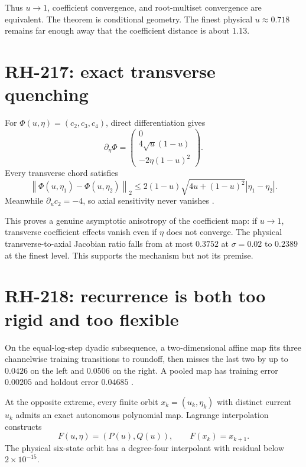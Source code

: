 \documentclass[12pt]{article}
\theoremstyle{remark}\newtheorem{remark}[theorem]{Remark}
\newcommand{\norm}[1]{\left\lVert#1\right\rVert}
\begin{document}
Thus $u\to1$, coefficient convergence, and root-multiset convergence are
equivalent.  The theorem is conditional geometry.  The finest physical
$u\approx0.718$ remains far enough away that the coefficient distance is
about $1.13$.

\section{RH-217: exact transverse quenching}

For $\Phi(u,\eta)=(c_2,c_3,c_4)$, direct differentiation gives
\begin{equation}
 \partial_\eta\Phi=
 \begin{pmatrix}
 0\\4\sqrt u(1-u)\\-2\eta(1-u)^2
 \end{pmatrix}.
\end{equation}
Every transverse chord satisfies
\begin{equation}\label{eq:quench}
 \norm{\Phi(u,\eta_1)-\Phi(u,\eta_2)}_2
 \le2(1-u)\sqrt{4u+(1-u)^2}|\eta_1-\eta_2|.
\end{equation}
Meanwhile $\partial_uc_2=-4$, so axial sensitivity never vanishes
\citep{WangRH217}.

This proves a genuine asymptotic anisotropy of the coefficient map: if
$u\to1$, transverse coefficient effects vanish even if $\eta$ does not
converge.  The physical transverse-to-axial Jacobian ratio falls from at most
$0.3752$ at $\sigma=0.02$ to $0.2389$ at the finest level.  This supports the
mechanism but not its premise.

\section{RH-218: recurrence is both too rigid and too flexible}

On the equal-log-step dyadic subsequence, a two-dimensional affine map fits
three channelwise training transitions to roundoff, then misses the last two
by up to $0.0426$ on the left and $0.0506$ on the right.  A pooled map has
training error $0.00205$ and holdout error $0.04685$
\citep{WangRH218}.

At the opposite extreme, every finite orbit
$x_k=(u_k,\eta_k)$ with distinct current $u_k$ admits an exact autonomous
polynomial map.  Lagrange interpolation constructs
\begin{equation}
 F(u,\eta)=(P(u),Q(u)),\qquad F(x_k)=x_{k+1}.
\end{equation}
The physical six-state orbit has a degree-four interpolant with residual
below $2\times10^{-15}$.
\end{document}
